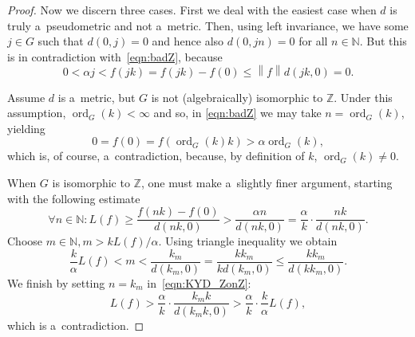 \documentclass[11pt,a4paper]{amsart}
\theoremstyle{definition}
\newcommand{\Z}{\mathbb{Z}}
\newcommand{\N}{\mathbb{N}}
\newcommand{\ord}{\operatorname{ord}}
\newcommand{\norm}[1]{\left\| #1 \right\|}
\begin{document}
\begin{proof}
		Now we discern three cases. First we deal with the easiest case when $d$ is truly a~pseudometric and not a~metric. Then, using left invariance, we have some $j \in G$ such that $d(0, j) = 0$ and hence also $d(0, jn) = 0$ for all $n \in \N$. But this is in contradiction with~\eqref{eqn:badZ}, because
		\begin{equation*}
			0 < \alpha j < f(jk) = f(jk) - f(0) \leq \norm{f} d(jk, 0) = 0.
		\end{equation*}
		
		Assume $d$ is a~metric, but $G$ is not (algebraically) isomorphic to $\Z$. Under this assumption, $\ord_G(k) < \infty$ and so, in \eqref{eqn:badZ} we may take $n = \ord_G(k)$, yielding
		\begin{equation*}
			0 = f(0) = f(\ord_G(k) k) > \alpha \ord_G(k),
		\end{equation*}
		which is, of course, a~contradiction, because, by definition of $k$, $\ord_G(k) \neq 0$.
		
		When $G$ is isomorphic to $\Z$, one must make a~slightly finer argument, starting with the following estimate
		\begin{equation} \label{eqn:KYD_ZonZ}
			\forall n \in \N \colon L(f) \geq \frac{f(nk) - f(0)}{d(nk, 0)}
			> \frac{\alpha n}{d(nk, 0)}
			= \frac{\alpha}{k} \cdot \frac{nk}{d(nk, 0)}.
		\end{equation}
		Choose $m \in \N, m > kL(f) /\alpha$. Using triangle inequality we obtain
		\begin{equation*}
			\frac{k}{\alpha} L(f)
			< m
			< \frac{k_m}{d(k_m, 0)}
			= \frac{kk_m}{kd(k_m, 0)}
			\leq \frac{kk_m}{d(kk_m, 0)}.
		\end{equation*}
		We finish by setting $n = k_m$ in~\eqref{eqn:KYD_ZonZ}:
		\begin{equation*}
			L(f) >
			\frac{\alpha}{k} \cdot \frac{k_m k}{d(k_m k, 0)}
			> \frac{\alpha}{k} \cdot \frac{k}{\alpha} L(f),
		\end{equation*}
		which is a~contradiction.
	\end{proof}
	
\end{document}
